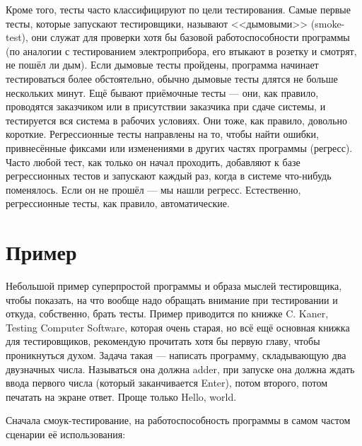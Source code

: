 \documentclass[a5paper]{article}
\begin{document}
Кроме того, тесты часто классифицируют по цели тестирования. Самые первые тесты, которые запускают тестировщики, называют <<дымовыми>> (smoke-test), они служат для проверки хотя бы базовой работоспособности программы (по аналогии с тестированием электроприбора, его втыкают в розетку и смотрят, не пошёл ли дым). Если дымовые тесты пройдены, программа начинает тестироваться более обстоятельно, обычно дымовые тесты длятся не больше нескольких минут. Ещё бывают приёмочные тесты --- они, как правило, проводятся заказчиком или в присутствии заказчика при сдаче системы, и тестируется вся система в рабочих условиях. Они тоже, как правило, довольно короткие. Регрессионные тесты направлены на то, чтобы найти ошибки, привнесённые фиксами или изменениями в других частях программы (регресс). Часто любой тест, как только он начал проходить, добавляют к базе регрессионных тестов и запускают каждый раз, когда в системе что-нибудь поменялось. Если он не прошёл --- мы нашли регресс. Естественно, регрессионные тесты, как правило, автоматические.

\section{Пример}

Небольшой пример суперпростой программы и образа мыслей тестировщика, чтобы показать, на что вообще надо обращать внимание при тестировании и откуда, собственно, брать тесты. Пример приводится по книжке C. Kaner, Testing Computer Software, которая очень старая, но всё ещё основная книжка для тестировщиков, рекомендую прочитать хотя бы первую главу, чтобы проникнуться духом. Задача такая --- написать программу, складывающую два двузначных числа. Называться она должна adder, при запуске она должна ждать ввода первого числа (который заканчивается Enter), потом второго, потом печатать на экране ответ. Проще только Hello, world.

Сначала смоук-тестирование, на работоспособность программы в самом частом сценарии её использования: 
\end{document}
